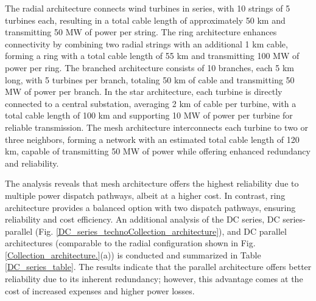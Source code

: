 \documentclass{ieeeaccess}
\begin{document}
The radial architecture connects wind turbines in series, with 10 strings of 5 turbines each, resulting in a total cable length of approximately 50 km and transmitting 50 MW of power per string. The ring architecture enhances connectivity by combining two radial strings with an additional 1 km cable, forming a ring with a total cable length of 55 km and transmitting 100 MW of power per ring. The branched architecture consists of 10 branches, each 5 km long, with 5 turbines per branch, totaling 50 km of cable and transmitting 50 MW of power per branch. In the star architecture, each turbine is directly connected to a central substation, averaging 2 km of cable per turbine, with a total cable length of 100 km and supporting 10 MW of power per turbine for reliable transmission. The mesh architecture interconnects each turbine to two or three neighbors, forming a network with an estimated total cable length of 120 km, capable of transmitting 50 MW of power while offering enhanced redundancy and reliability.

The analysis reveals that mesh architecture offers the highest reliability due to multiple power dispatch pathways, albeit at a higher cost. In contrast, ring architecture provides a balanced option with two dispatch pathways, ensuring reliability and cost efficiency. An additional analysis of the DC series, DC series-parallel (Fig. \ref{DC_series_technoCollection_architecture}), and DC parallel architectures (comparable to the radial configuration shown in Fig. \ref{Collection_architecture.}(a)) is conducted and summarized in Table \ref{DC_series_table}. The results indicate that the parallel architecture offers better reliability due to its inherent redundancy; however, this advantage comes at the cost of increased expenses and higher power losses.
\end{document}
